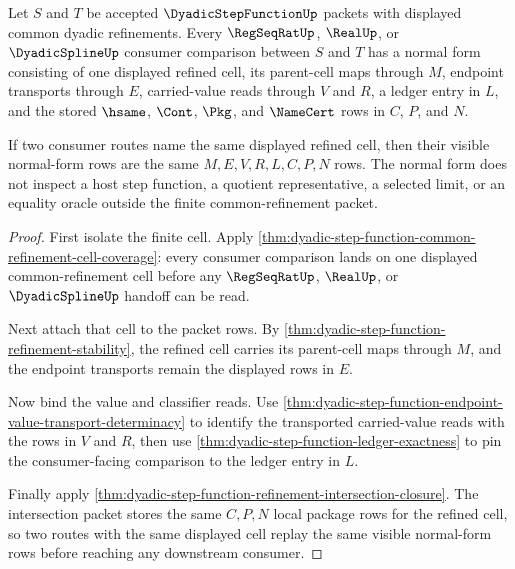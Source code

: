 \begin{theorem}
\label{thm:dyadic-step-function-common-refinement-normal-form}
Let $S$ and $T$ be accepted $\DyadicStepFunctionUp$ packets with displayed common dyadic refinements. Every $\RegSeqRatUp$, $\RealUp$, or $\DyadicSplineUp$ consumer comparison between $S$ and $T$ has a normal form consisting of one displayed refined cell, its parent-cell maps through $M$, endpoint transports through $E$, carried-value reads through $V$ and $R$, a ledger entry in $L$, and the stored $\hsame$, $\Cont$, $\Pkg$, and $\NameCert$ rows in $C$, $P$, and $N$.

If two consumer routes name the same displayed refined cell, then their visible normal-form rows are the same $M,E,V,R,L,C,P,N$ rows. The normal form does not inspect a host step function, a quotient representative, a selected limit, or an equality oracle outside the finite common-refinement packet.
\end{theorem}
\begin{proof}
First isolate the finite cell. Apply \autoref{thm:dyadic-step-function-common-refinement-cell-coverage}: every consumer comparison lands on one displayed common-refinement cell before any $\RegSeqRatUp$, $\RealUp$, or $\DyadicSplineUp$ handoff can be read.

Next attach that cell to the packet rows. By \autoref{thm:dyadic-step-function-refinement-stability}, the refined cell carries its parent-cell maps through $M$, and the endpoint transports remain the displayed rows in $E$.

Now bind the value and classifier reads. Use \autoref{thm:dyadic-step-function-endpoint-value-transport-determinacy} to identify the transported carried-value reads with the rows in $V$ and $R$, then use \autoref{thm:dyadic-step-function-ledger-exactness} to pin the consumer-facing comparison to the ledger entry in $L$.

Finally apply \autoref{thm:dyadic-step-function-refinement-intersection-closure}. The intersection packet stores the same $C,P,N$ local package rows for the refined cell, so two routes with the same displayed cell replay the same visible normal-form rows before reaching any downstream consumer.
\end{proof}

